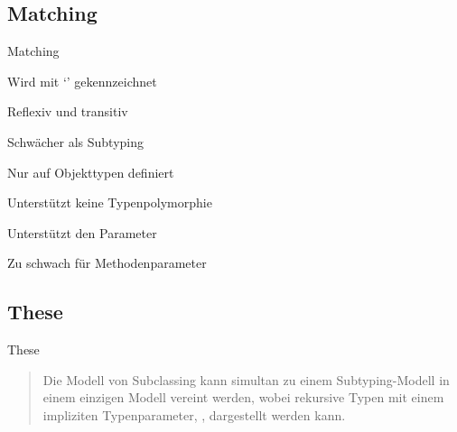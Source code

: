 \subsection{Matching}
\begin{frame}{Matching}
	\begin{bigitemize}[<+->]{3mm}
		\item Wird mit `\match' gekennzeichnet

		\item Reflexiv und transitiv

		\item Schwächer als Subtyping

		\item Nur auf Objekttypen definiert

		\item Unterstützt keine Typenpolymorphie

		\item Unterstützt den \mytype Parameter

		\item Zu schwach für Methodenparameter
	\end{bigitemize}
\end{frame}

\subsection{These}
\begin{frame}[c]{These}
	\begin{quote}
	Die Modell von Subclassing kann simultan zu einem Subtyping-Modell
	in einem einzigen Modell vereint werden, wobei rekursive Typen mit
	einem impliziten Typenparameter, \mytype, dargestellt werden kann.
	\end{quote}
\end{frame}
